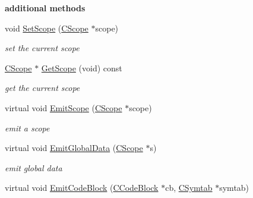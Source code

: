 \begin{Indent}{\bf additional methods}\par
\begin{DoxyCompactItemize}
\item 
\hypertarget{classCBackendx86_a044b54c080a16dac6fcb4da1b1aff1c4}{void \hyperlink{classCBackendx86_a044b54c080a16dac6fcb4da1b1aff1c4}{Set\-Scope} (\hyperlink{classCScope}{C\-Scope} $\ast$scope)}\label{classCBackendx86_a044b54c080a16dac6fcb4da1b1aff1c4}

\begin{DoxyCompactList}\small\item\em set the current scope \end{DoxyCompactList}\item 
\hypertarget{classCBackendx86_ac27f812a834600af173d2a0c56620a05}{\hyperlink{classCScope}{C\-Scope} $\ast$ \hyperlink{classCBackendx86_ac27f812a834600af173d2a0c56620a05}{Get\-Scope} (void) const }\label{classCBackendx86_ac27f812a834600af173d2a0c56620a05}

\begin{DoxyCompactList}\small\item\em get the current scope \end{DoxyCompactList}\item 
\hypertarget{classCBackendx86_af441776ec2b3cbd1116d4286b005fcd7}{virtual void \hyperlink{classCBackendx86_af441776ec2b3cbd1116d4286b005fcd7}{Emit\-Scope} (\hyperlink{classCScope}{C\-Scope} $\ast$scope)}\label{classCBackendx86_af441776ec2b3cbd1116d4286b005fcd7}

\begin{DoxyCompactList}\small\item\em emit a scope \end{DoxyCompactList}\item 
\hypertarget{classCBackendx86_af2994ccd494b257ff129754ec4962125}{virtual void \hyperlink{classCBackendx86_af2994ccd494b257ff129754ec4962125}{Emit\-Global\-Data} (\hyperlink{classCScope}{C\-Scope} $\ast$s)}\label{classCBackendx86_af2994ccd494b257ff129754ec4962125}

\begin{DoxyCompactList}\small\item\em emit global data \end{DoxyCompactList}\item 
\hypertarget{classCBackendx86_a982ab32ae826524afdf87ca4142fa6b7}{virtual void \hyperlink{classCBackendx86_a982ab32ae826524afdf87ca4142fa6b7}{Emit\-Code\-Block} (\hyperlink{classCCodeBlock}{C\-Code\-Block} $\ast$cb, \hyperlink{classCSymtab}{C\-Symtab} $\ast$symtab)}\label{classCBackendx86_a982ab32ae826524afdf87ca4142fa6b7}


\end{DoxyCompactItemize}
\end{Indent}
